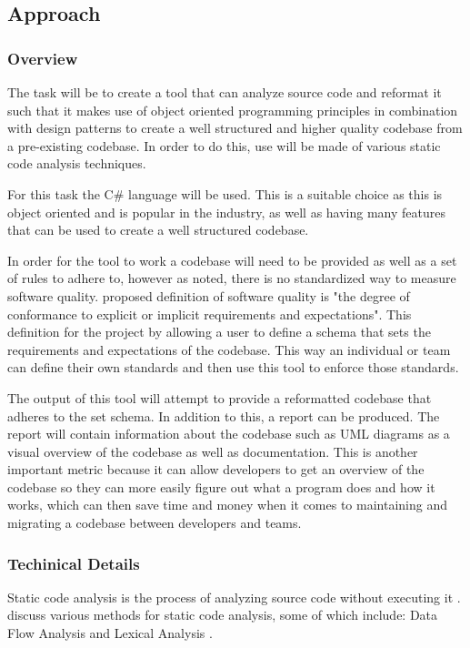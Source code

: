 \subsection{Approach}

\subsubsection{Overview}
The task will be to create a tool that can analyze source code and reformat it such that it makes use of object oriented programming principles in combination with design patterns to create a well structured and higher quality codebase from a pre-existing codebase. In order to do this, use will be made of various static code analysis techniques.

For this task the C\# language will be used. This is a suitable choice as this is object oriented and is popular in the industry, as well as having many features that can be used to create a well structured codebase.

In order for the tool to work a codebase will need to be provided as well as a set of rules to adhere to, however as noted, there is no standardized way to measure software quality. \cite{8681007} proposed definition of software quality is "the degree of conformance to explicit or implicit requirements and expectations". This definition for the project by allowing a user to define a schema that sets the requirements and expectations of the codebase. This way an individual or team can define their own standards and then use this tool to enforce those standards.

The output of this tool will attempt to provide a reformatted codebase that adheres to the set schema. In addition to this, a report can be produced. The report will contain information about the codebase such as UML diagrams as a visual overview of the codebase as well as documentation. This is another important metric because it can allow developers to get an overview of the codebase so they can more easily figure out what a program does and how it works, which can then save time and money when it comes to maintaining and migrating a codebase between developers and teams.

\subsubsection{Techinical Details}
Static code analysis is the process of analyzing source code without executing it \citep{8802820}. \cite{owasp/StaticCodeAnalysis} discuss various methods for static code analysis, some of which include: Data Flow Analysis \citep{owasp/StaticCodeAnalysis} and Lexical Analysis \citep{owasp/StaticCodeAnalysis}.

